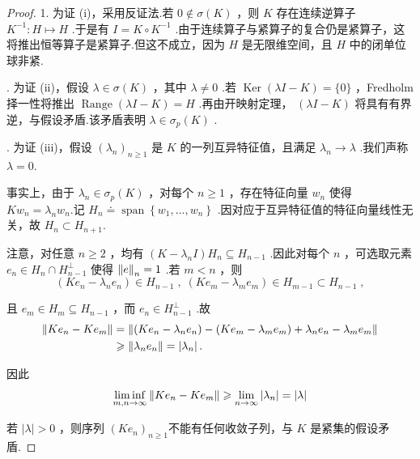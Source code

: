\begin{proof}
1. 为证 (i)，采用反证法.若 $0 \notin  \sigma \left( K\right)$ ，则 $K$ 存在连续逆算子 ${K}^{-1} : H \mapsto  H$ .于是有 $I = K \circ  {K}^{-1}$ .由于连续算子与紧算子的复合仍是紧算子，这将推出恒等算子是紧算子.但这不成立，因为 $H$ 是无限维空间，且 $H$ 中的闭单位球非紧.

. 为证 (ii)，假设 $\lambda  \in  \sigma \left( K\right)$ ，其中 $\lambda  \neq  0$ .若 $\operatorname{Ker}\left( {{\lambda I} - K}\right)  = \{ 0\}$ ，Fredholm择一性将推出 $\operatorname{Range}\left( {{\lambda I} - K}\right)  = H$ .再由开映射定理， $\left( {{\lambda I} - K}\right)$ 将具有有界逆，与假设矛盾.该矛盾表明 $\lambda  \in  {\sigma }_{p}\left( K\right)$ .

. 为证 (iii)，假设 ${\left( {\lambda }_{n}\right) }_{n \geq  1}$ 是 $K$ 的一列互异特征值，且满足 ${\lambda }_{n} \rightarrow  \lambda$ .我们声称 $\lambda  = 0$.

事实上，由于 ${\lambda }_{n} \in  {\sigma }_{p}\left( K\right)$ ，对每个 $n \geq  1$ ，存在特征向量 ${w}_{n}$ 使得 $K{w}_{n} = {\lambda }_{n}{w}_{n}$.记 ${H}_{n} \doteq  \operatorname{span}\left\{  {{w}_{1},\ldots ,{w}_{n}}\right\}$ .因对应于互异特征值的特征向量线性无关，故 ${H}_{n} \subset  {H}_{n + 1}$.

注意，对任意 $n \geq  2$ ，均有 $\left( {K - {\lambda }_{n}I}\right) {H}_{n} \subseteq  {H}_{n - 1}$ .因此对每个 $n$ ，可选取元素 ${e}_{n} \in  {H}_{n} \cap  {H}_{n - 1}^{ \bot  }$ 使得 $\norm{e}_{n} = 1$ .若 $m < n$ ，则
\[
\left( {K{e}_{n} - {\lambda }_{n}{e}_{n}}\right)  \in  {H}_{n - 1}\;,\;\left( {K{e}_{m} - {\lambda }_{m}{e}_{m}}\right)  \in  {H}_{m - 1} \subset  {H}_{n - 1}\;,
\]

且 ${e}_{m} \in  {H}_{m} \subseteq  {H}_{n - 1}$ ，而 ${e}_{n} \in  {H}_{n - 1}^{ \bot  }$ .故
{\setjot[-2]\begin{align*}
\norm{K{e}_{n} - K{e}_{m}} &= \norm{\left( {K{e}_{n} - {\lambda }_{n}{e}_{n}}\right)  - \left( {K{e}_{m} - {\lambda }_{m}{e}_{m}}\right)  + {\lambda }_{n}{e}_{n} - {\lambda }_{m}{e}_{m}}\\
&\geqslant  \norm{{\lambda }_{n}{e}_{n}} = \left| {\lambda }_{n}\right| .
\end{align*}}

因此
\[
\mathop{\liminf }\limits_{{m,n \rightarrow  \infty }}\norm{K{e}_{n} - K{e}_{m}} \geqslant  \mathop{\lim }\limits_{{n \rightarrow  \infty }}\left| {\lambda }_{n}\right|  = \left| \lambda \right|
\]

若 $\left| \lambda \right|  > 0$ ，则序列 ${\left( K{e}_{n}\right) }_{n \geq  1}$不能有任何收敛子列，与 $K$ 是紧集的假设矛盾.
\end{proof}

